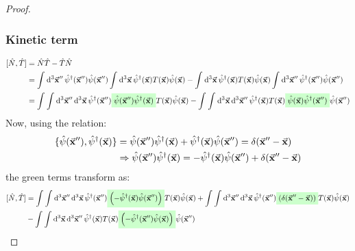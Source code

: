 \documentclass[11pt, a4paper, twoside, openright]{article}
\begin{document}
\begin{proof}
\subsubsection*{Kinetic term}
\begin{equation*}
\begin{split}
  [\hat{N},\hat{T}  ]&= \hat{N}\hat{T} - \hat{T}\hat{N} \\
  &=  \int_{}^{} \dd[3]{\va{x}''} \hat{\psi }^\dag (\va{x}'') \hat{\psi }(\va{x}'')
      \int_{}^{} \dd[3]{\va{x}} \hat{\psi } ^\dag  (\va{x}) T (\va{x}) \hat{\psi }(\va{x})
      -
      \int_{}^{} \dd[3]{\va{x}} \hat{\psi } ^\dag  (\va{x}) T (\va{x}) \hat{\psi }(\va{x})
      \int_{}^{} \dd[3]{\va{x}''} \hat{\psi }^\dag (\va{x}'') \hat{\psi }(\va{x}'') \\
  &= \int_{}^{} \int_{}^{} \dd[3]{\va{x}''} \dd[3]{\va{x}}  \hat{\psi }^\dag (\va{x}'') \mathcolorbox{green!20}{ \hat{\psi }(\va{x}'') \hat{\psi } ^\dag  (\va{x}) }  T (\va{x}) \hat{\psi }(\va{x})
      - \int_{}^{} \int_{}^{} \dd[3]{\va{x}} \dd[3]{\va{x}''} \hat{\psi } ^\dag  (\va{x}) T (\va{x}) \mathcolorbox{green!20}{ \hat{\psi }(\va{x}) \hat{\psi }^\dag (\va{x}'') } \hat{\psi }(\va{x}'')
\end{split}
\end{equation*}
Now, using the relation:
\begin{equation}
\begin{split}
  \{ \hat{\psi } (\va{x}''), \hat{\psi }^\dag (\va{x}) \} &=   \hat{\psi } (\va{x}'') \hat{\psi }^\dag (\va{x}) +   \hat{\psi }^\dag (\va{x}) \hat{\psi } (\va{x}'') = \delta (\va{x}''-\va{x})  \\
  & \Rightarrow \hat{\psi } (\va{x}'') \hat{\psi }^\dag (\va{x}) = - \hat{\psi }^\dag (\va{x}) \hat{\psi } (\va{x}'') + \delta (\va{x}''-\va{x})
\end{split}
\label{eq:anticommutator}
\end{equation}
the green terms transform as:
\begin{equation*}
\begin{split}
  [\hat{N},\hat{T}  ] &=
      \int_{}^{} \int_{}^{} \dd[3]{\va{x}''} \dd[3]{\va{x}}  \hat{\psi }^\dag (\va{x}'') \mathcolorbox{green!20}{  \qty( - \hat{\psi }^\dag (\va{x}) \hat{\psi } (\va{x}'') )
      }   T (\va{x}) \hat{\psi }(\va{x})
      + \int_{}^{} \int_{}^{} \dd[3]{\va{x}''} \dd[3]{\va{x}}  \hat{\psi }^\dag (\va{x}'') \mathcolorbox{green!20}{  \qty( \delta (\va{x}''-\va{x}) )
      }   T (\va{x}) \hat{\psi }(\va{x})
      \\
      &-
      \int_{}^{} \int_{}^{} \dd[3]{\va{x}} \dd[3]{\va{x}''} \hat{\psi } ^\dag  (\va{x}) T (\va{x}) \mathcolorbox{green!20}{ \qty(- \hat{\psi }^\dag (\va{x}'') \hat{\psi } (\va{x})) } \hat{\psi }(\va{x}'')

\end{split}
\end{equation*}
\end{proof}
\end{document}
